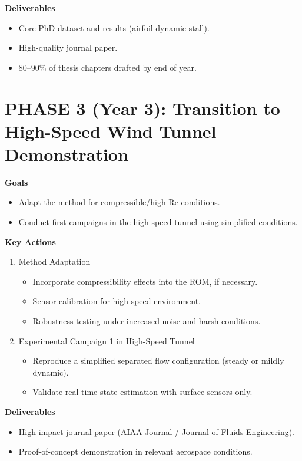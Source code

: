 \documentclass[12pt,a4paper]{article}
\begin{document}
\textbf{Deliverables}

\begin{itemize}
    \item Core PhD dataset and results (airfoil dynamic stall).
    \item High-quality journal paper.
    \item 80–90\% of thesis chapters drafted by end of year.
\end{itemize}

\section{PHASE 3 (Year 3): Transition to High-Speed Wind Tunnel Demonstration}
\textbf{Goals}

\begin{itemize}
    \item Adapt the method for compressible/high-Re conditions.
    \item Conduct first campaigns in the high-speed tunnel using simplified conditions.
\end{itemize}

\textbf{Key Actions}

\begin{enumerate}
    \item Method Adaptation
    \begin{itemize}
        \item Incorporate compressibility effects into the ROM, if necessary.
        \item Sensor calibration for high-speed environment.
        \item Robustness testing under increased noise and harsh conditions.
    \end{itemize}
    \item Experimental Campaign 1 in High-Speed Tunnel
    \begin{itemize}
        \item Reproduce a simplified separated flow configuration (steady or mildly dynamic).
        \item Validate real-time state estimation with surface sensors only.
    \end{itemize}
\end{enumerate}


\textbf{Deliverables}
\begin{itemize}
    \item High-impact journal paper (AIAA Journal / Journal of Fluids Engineering).
    \item Proof-of-concept demonstration in relevant aerospace conditions.
\end{itemize}
\end{document}
